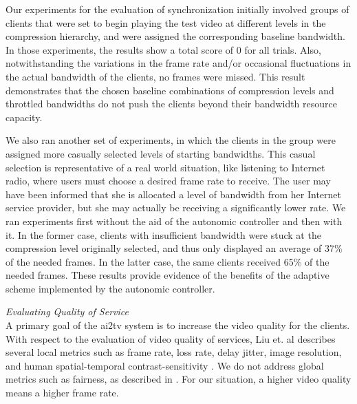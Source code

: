 \documentclass{sig-alternate}
\begin{document}
Our experiments for the evaluation of synchronization initially
involved groups of clients that were set to begin playing the test
video at different levels in the compression hierarchy, and were
assigned the corresponding baseline bandwidth. In those experiments,
the results show a total score of 0 for all trials. Also,
notwithstanding the variations in the frame rate and/or occasional
fluctuations in the actual bandwidth of the clients, no frames were
missed.  This result demonstrates that the chosen baseline
combinations of compression levels and throttled bandwidths do not
push the clients beyond their bandwidth resource capacity.

We also ran another set of experiments, in which the clients in the
group were assigned more casually selected levels of starting
bandwidths.  This casual selection is representative of a real world
situation, like listening to Internet radio, where users must choose a
desired frame rate to receive.  The user may have been informed that
she is allocated a level of bandwidth from her Internet service
provider, but she may actually be receiving a significantly lower
rate.  We ran experiments first without the aid of the autonomic
controller and then with it. In the former case, clients with
insufficient bandwidth were stuck at the compression level originally
selected, and thus only displayed an average of 37\% of the needed
frames.  In the latter case, the same clients received 65\% of the
needed frames.  These results provide evidence of the benefits of the
adaptive scheme implemented by the autonomic controller.



\textit{Evaluating Quality of Service} \\ A primary goal of the ai2tv
system is to increase the video quality for the clients.  With respect
to the evaluation of video quality of services, Liu et. al describes
several local metrics such as frame rate, loss rate, delay jitter,
image resolution, and human spatial-temporal contrast-sensitivity
\cite{LIU}.  We do not address global metrics such as fairness, as
described in \cite{LIU}.  For our situation, a higher video quality
means a higher frame rate.
\end{document}
